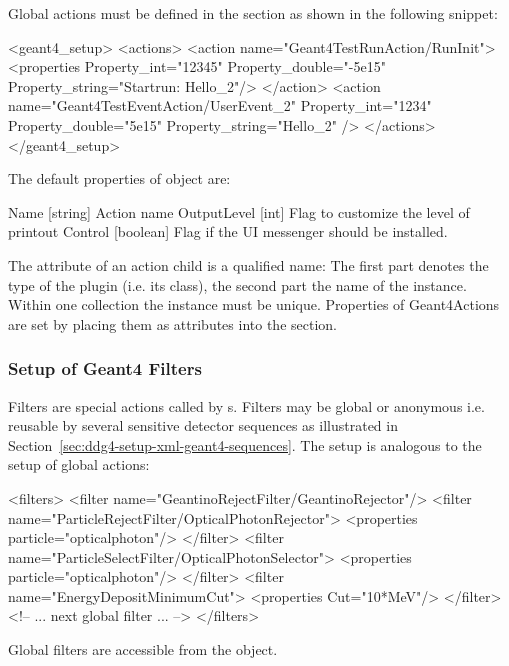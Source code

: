 \documentclass[10pt,a4paper]{article}
\begin{document}
\noindent
Global actions must be defined in the  section as shown in the following snippet:
\begin{code}
<geant4_setup>
  <actions>
    <action name="Geant4TestRunAction/RunInit">
      <properties Property_int="12345"
          Property_double="-5e15"
          Property_string="Startrun: Hello_2"/>
     </action>
    <action name="Geant4TestEventAction/UserEvent_2"
            Property_int="1234"
            Property_double="5e15"
            Property_string="Hello_2" />
  </actions>
</geant4_setup>
\end{code}
The default properties of   object are:
\begin{unnumberedcode}
Name        [string]                Action name
OutputLevel [int]                   Flag to customize the level of printout
Control     [boolean]               Flag if the UI messenger should be installed.
\end{unnumberedcode}
The  attribute of an action child is a qualified name: The first part
denotes the type of the plugin (i.e. its class), the second part the name of the instance.
Within one collection the instance  must be unique.
Properties of Geant4Actions are set by placing them as attributes into the
 section.

\subsubsection{Setup of Geant4 Filters}
\label{sec:ddg4-setup-xml-geant4-filters}
\noindent
Filters are special actions called by s. 
Filters may be global or anonymous i.e. reusable by several sensitive detector
sequences as illustrated in Section~\ref{sec:ddg4-setup-xml-geant4-sequences}. 
The setup is analogous to the setup of global actions:
\begin{code}
  <filters>
    <filter name="GeantinoRejectFilter/GeantinoRejector"/>
    <filter name="ParticleRejectFilter/OpticalPhotonRejector">
      <properties particle="opticalphoton"/>
    </filter>
    <filter name="ParticleSelectFilter/OpticalPhotonSelector">
      <properties particle="opticalphoton"/>
    </filter>
    <filter name="EnergyDepositMinimumCut">
      <properties Cut="10*MeV"/>
    </filter>
    <!--        ... next global filter ...       -->
  </filters>
\end{code}
Global filters are accessible from the  object.
\end{document}
